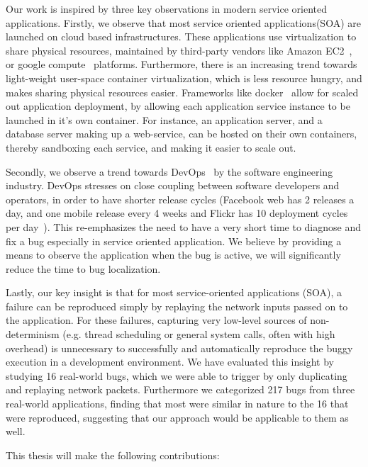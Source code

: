 Our work is inspired by three key observations in modern service oriented applications.
Firstly, we observe that most service oriented applications(SOA) are launched on cloud based infrastructures.
These applications use virtualization to share physical resources, maintained by third-party vendors like Amazon EC2~\cite{ec2}, or google compute~\cite{gcompute} platforms.
Furthermore, there is an increasing trend towards light-weight user-space container virtualization, which is less resource hungry, and makes sharing physical resources easier.
Frameworks like docker~\cite{docker} allow for scaled out application deployment, by allowing each application service instance to be launched in it's own container.
For instance, an application server, and a database server making up a web-service, can be hosted on their own containers, thereby sandboxing each service, and making it easier to scale out.

Secondly, we observe a trend towards DevOps~\cite{devops} by the software engineering industry.
DevOps stresses on close coupling between software developers and operators, in order to have shorter release cycles (Facebook web has 2 releases a day, and one mobile release every 4 weeks and Flickr has 10 deployment cycles per day~\cite{releaseFacebookKeynote,10DevOps}).
This re-emphasizes the need to have a very short time to diagnose and fix a bug especially in service oriented application.
We believe by providing a means to observe the application when the bug is active, we will significantly reduce the time to bug localization.

Lastly, our key insight is that for most service-oriented applications (SOA), a failure can be reproduced simply by replaying the network inputs passed on to the application.
For these failures, capturing very low-level sources of non-determinism (e.g. thread scheduling or general system calls, often with high overhead) is unnecessary to successfully and automatically reproduce the buggy execution in a development environment. 
We have evaluated this insight by studying 16 real-world bugs, which we were able to trigger by only duplicating and replaying network packets.
Furthermore we categorized 217 bugs from three real-world applications, finding that most were similar in nature to the 16 that were reproduced, suggesting that our approach would be applicable to them as well.

\noindent This thesis will make the following contributions:

